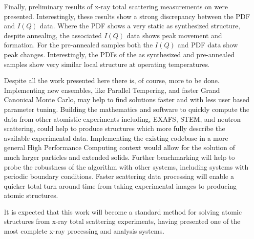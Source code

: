 Finally, preliminary results of x-ray total scattering measurements on  were presented.
Interestingly, these results show a strong discrepancy between the PDF and $I(Q)$ data.
Where the PDF shows a very static as synthesized structure, despite annealing, the associated $I(Q)$ data shows peak movement and formation.
For the pre-annealed samples both the $I(Q)$ and PDF data show peak changes.
Interestingly, the PDFs of the as synthesized and pre-annealed samples show very similar local structure at operating temperatures.

Despite all the work presented here there is, of course, more to be done.
Implementing new ensembles, like Parallel Tempering, and faster Grand Canonical Monte Carlo, may help to find solutions faster and with less user based parameter tuning.
Building the mathematics and software to quickly compute the data from other atomistic experiments including, EXAFS, STEM, and neutron scattering, could help to produce structures which more fully describe the available experimental data.
Implementing the existing codebase in a more general High Performance Computing context would allow for the solution of much larger particles and extended solids.
Further benchmarking will help to probe the robustness of the algorithm with other systems, including systems with periodic boundary conditions.
Faster scattering data processing will enable a quicker total turn around time from taking experimental images to producing atomic structures.

It is expected that this work will become a standard method for solving atomic structures from x-ray total scattering experiments, having presented one of the most complete x-ray processing and analysis systems.